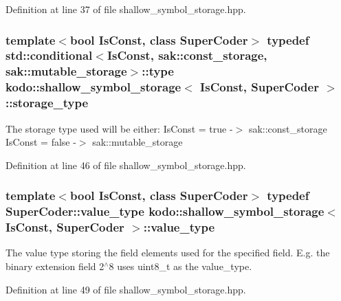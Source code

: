 Definition at line 37 of file shallow\-\_\-symbol\-\_\-storage.\-hpp.

\hypertarget{classkodo_1_1shallow__symbol__storage_a258cef59dc5a316875bcdce09ab0c338}{
\subsubsection[{storage\-\_\-type}]{\setlength{\rightskip}{0pt plus 5cm}template$<$bool Is\-Const, class Super\-Coder$>$ typedef std\-::conditional$<$Is\-Const, sak\-::const\-\_\-storage, sak\-::mutable\-\_\-storage$>$\-::type {\bf kodo\-::shallow\-\_\-symbol\-\_\-storage}$<$ Is\-Const, Super\-Coder $>$\-::{\bf storage\-\_\-type}}}\label{classkodo_1_1shallow__symbol__storage_a258cef59dc5a316875bcdce09ab0c338}
The storage type used will be either\-: Is\-Const = true -\/$>$ sak\-::const\-\_\-storage Is\-Const = false -\/$>$ sak\-::mutable\-\_\-storage 

Definition at line 46 of file shallow\-\_\-symbol\-\_\-storage.\-hpp.

\hypertarget{classkodo_1_1shallow__symbol__storage_abb7de59459d66e0eeb8a6406b074122f}{
\subsubsection[{value\-\_\-type}]{\setlength{\rightskip}{0pt plus 5cm}template$<$bool Is\-Const, class Super\-Coder$>$ typedef Super\-Coder\-::value\-\_\-type {\bf kodo\-::shallow\-\_\-symbol\-\_\-storage}$<$ Is\-Const, Super\-Coder $>$\-::{\bf value\-\_\-type}}}\label{classkodo_1_1shallow__symbol__storage_abb7de59459d66e0eeb8a6406b074122f}




The value type storing the field elements used for the specified field. E.\-g. the binary extension field 2$^\wedge$8 uses uint8\-\_\-t as the value\-\_\-type. 

Definition at line 49 of file shallow\-\_\-symbol\-\_\-storage.\-hpp.



